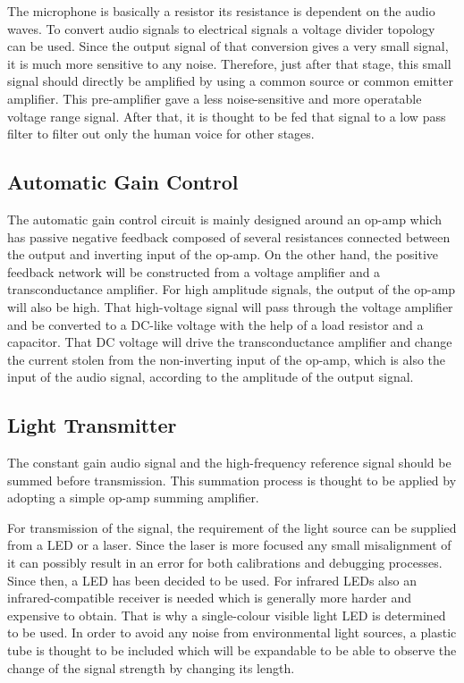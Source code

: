 \documentclass[a4paper,10pt]{IEEEtran}
\begin{document}
The microphone is basically a resistor its resistance is dependent on the audio waves. To convert audio signals to electrical signals a voltage divider topology can be used. Since the output signal of that conversion gives a very small signal, it is much more sensitive to any noise. Therefore, just after that stage, this small signal should directly be amplified by using a common source or common emitter amplifier. This pre-amplifier gave a less noise-sensitive and more operatable voltage range signal. After that, it is thought to be fed that signal to a low pass filter to filter out only the human voice for other stages. 

\subsection{Automatic Gain Control}

The automatic gain control circuit is mainly designed around an op-amp which has passive negative feedback composed of several resistances connected between the output and inverting input of the op-amp. On the other hand, the positive feedback network will be constructed from a voltage amplifier and a transconductance amplifier. For high amplitude signals, the output of the op-amp will also be high. That high-voltage signal will pass through the voltage amplifier and be converted to a DC-like voltage with the help of a load resistor and a capacitor. That DC voltage will drive the transconductance amplifier and change the current stolen from the non-inverting input of the op-amp, which is also the input of the audio signal, according to the amplitude of the output signal. 

\subsection{Light Transmitter}

The constant gain audio signal and the high-frequency reference signal should be summed before transmission. This summation process is thought to be applied by adopting a simple op-amp summing amplifier. 	

For transmission of the signal, the requirement of the light source can be supplied from a LED or a laser. Since the laser is more focused any small misalignment of it can possibly result in an error for both calibrations and debugging processes. Since then, a LED has been decided to be used. For infrared LEDs also an infrared-compatible receiver is needed which is generally more harder and expensive to obtain. That is why a single-colour visible light LED is determined to be used. In order to avoid any noise from environmental light sources, a plastic tube is thought to be included which will be expandable to be able to observe the change of the signal strength by changing its length. 
\end{document}
